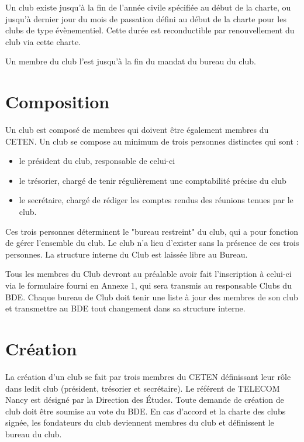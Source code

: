 \documentclass{article} %
\begin{document}
\begin{multicols}{2}
{			Un club existe jusqu’à la fin de l’année civile spécifiée au début
			de la charte, ou jusqu’à dernier jour du mois de passation défini au
			début de la charte pour les clubs de type évènementiel. Cette durée
			est reconductible par renouvellement du club via cette charte.

			Un membre du club l’est jusqu’à la fin du mandat du bureau du club.
			
		}

		\section{Composition}
		
		{\small
		
			Un club est composé de membres qui doivent être également membres du
			CETEN. Un club se compose au minimum de trois personnes distinctes
			qui sont :
			\begin{itemize}
				\item le président du club, responsable de celui-ci
				\item le trésorier, chargé de tenir régulièrement une
					comptabilité précise du club
				\item le secrétaire, chargé de rédiger les comptes rendus des 
					réunions tenues par le club.
			\end{itemize}
			Ces trois personnes déterminent le "bureau restreint" du club, qui a
			pour fonction de gérer l’ensemble du club. Le club n’a lieu
			d’exister sans la présence de ces trois personnes. La structure
			interne du Club est laissée libre au Bureau.

			Tous les membres du Club devront au préalable avoir fait
			l’inscription à celui-ci via le formulaire fourni en Annexe 1, qui
			sera transmis au responsable Clubs du BDE.
			Chaque bureau de Club doit tenir une liste à jour des membres de son
			club et transmettre au BDE tout changement dans sa structure
			interne.
			
		}
		
		\section{Création}
		
		{\small
		
			La création d’un club se fait par trois membres du CETEN définissant
			leur rôle dans ledit club (président, trésorier et secrétaire). Le
			référent de TELECOM Nancy est désigné par la Direction des Études.
			Toute demande de création de club doit être soumise au vote du BDE.
			En cas d’accord et la charte des clubs signée, les fondateurs du
			club deviennent membres du club et définissent le bureau du club.
			
}
\end{multicols}
\end{document}
